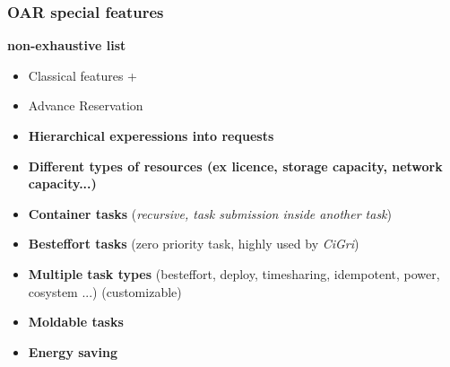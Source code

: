 \documentclass{beamer}
\begin{document}
\begin{frame}
\frametitle{OAR special features}
	{\bf non-exhaustive list}
		\begin{itemize}
    \item Classical features +
    \item Advance Reservation
		\item {\bf Hierarchical experessions into requests }
		\item {\bf Different types of resources (ex licence, storage capacity, network capacity...)  }
		\item {\bf Container tasks} ({\em recursive, task submission inside another task})
		\item {\bf Besteffort tasks} (zero priority task, highly used by {\em CiGri}) 
		\item {\bf Multiple task types} (besteffort, deploy, timesharing, idempotent, power, cosystem ...) (customizable)
    		\item {\bf Moldable tasks}
    		\item {\bf Energy saving}
		
	\end{itemize}
\end{frame}
\end{document}
